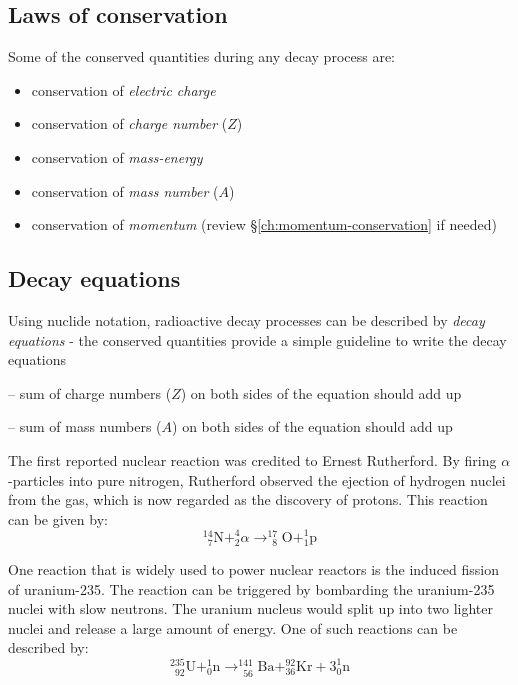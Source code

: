 \subsection{Laws of conservation}

Some of the conserved quantities during any decay process are:
\begin{itemize}
    \item conservation of \emph{electric charge}
    \item conservation of \emph{charge number} ($Z$)
    \item conservation of \emph{mass-energy}
    \item conservation of \emph{mass number} ($A$)
    \item conservation of \emph{momentum} (review \S\ref{ch:momentum-conservation} if needed)
\end{itemize}

\subsection{Decay equations}

Using nuclide notation, radioactive decay processes can be described by \emph{decay equations} - the conserved quantities provide a simple guideline to write the decay equations 

\begin{compactenum}
	\item[--] sum of charge numbers ($Z$) on both sides of the equation should add up
	
	\item[--] sum of mass numbers ($A$) on both sides of the equation should add up
\end{compactenum}


The first reported nuclear reaction was credited to Ernest Rutherford. By firing $\alpha$-particles into pure nitrogen, Rutherford observed the ejection of hydrogen nuclei from the gas, which is now regarded as the discovery of protons. This reaction can be given by:
\begin{equation*}
_{\phantom{0}7}^{14} \text{N} + _2^4 \alpha \longrightarrow _{\phantom{0}8}^{17} \text{O} + _{1}^{1} \text{p} 
\end{equation*} 


One reaction that is widely used to power nuclear reactors is the induced fission of uranium-235. The reaction can be triggered by bombarding the uranium-235 nuclei with slow neutrons. The uranium nucleus would split up into two lighter nuclei and release a large amount of energy. One of such reactions can be described by:
\begin{equation*}
 _{\phantom{0}92}^{235} \text{U} + _0^1 \text{n} \longrightarrow _{\phantom{0}56}^{141} \text{Ba} + _{36}^{92} \text{Kr} + 3_0^1 \text{n} 
\end{equation*} 




